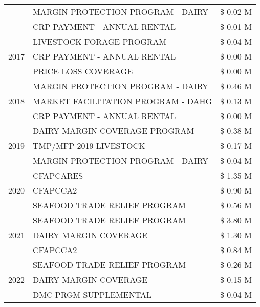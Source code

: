 \begin{tabular}{llr}
 & MARGIN PROTECTION PROGRAM - DAIRY & \$ 0.02 M \\
 & CRP PAYMENT - ANNUAL RENTAL & \$ 0.01 M \\
\cline{1-3}
\multirow[t]{3}{*}{2017} & LIVESTOCK FORAGE PROGRAM & \$ 0.04 M \\
 & CRP PAYMENT - ANNUAL RENTAL & \$ 0.00 M \\
 & PRICE LOSS COVERAGE & \$ 0.00 M \\
\cline{1-3}
\multirow[t]{3}{*}{2018} & MARGIN PROTECTION PROGRAM - DAIRY & \$ 0.46 M \\
 & MARKET FACILITATION PROGRAM - DAHG & \$ 0.13 M \\
 & CRP PAYMENT - ANNUAL RENTAL & \$ 0.00 M \\
\cline{1-3}
\multirow[t]{3}{*}{2019} & DAIRY MARGIN COVERAGE PROGRAM & \$ 0.38 M \\
 & TMP/MFP 2019 LIVESTOCK & \$ 0.17 M \\
 & MARGIN PROTECTION PROGRAM - DAIRY & \$ 0.04 M \\
\cline{1-3}
\multirow[t]{3}{*}{2020} & CFAPCARES & \$ 1.35 M \\
 & CFAPCCA2 & \$ 0.90 M \\
 & SEAFOOD TRADE RELIEF PROGRAM & \$ 0.56 M \\
\cline{1-3}
\multirow[t]{3}{*}{2021} & SEAFOOD TRADE RELIEF PROGRAM & \$ 3.80 M \\
 & DAIRY MARGIN COVERAGE & \$ 1.30 M \\
 & CFAPCCA2 & \$ 0.84 M \\
\cline{1-3}
\multirow[t]{3}{*}{2022} & SEAFOOD TRADE RELIEF PROGRAM & \$ 0.26 M \\
 & DAIRY MARGIN COVERAGE & \$ 0.15 M \\
 & DMC PRGM-SUPPLEMENTAL & \$ 0.04 M \\
\cline{1-3}
\bottomrule
\end{tabular}

